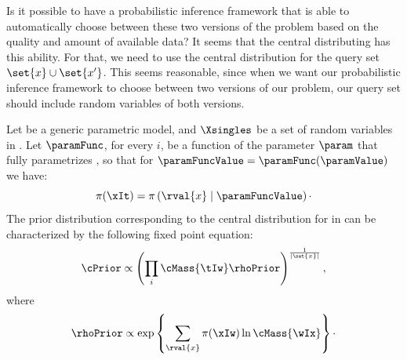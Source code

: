 Is it possible to have a probabilistic inference framework that is able to automatically choose between these two
versions of the problem based on the quality and amount of available data?
It seems that the central distributing has this ability.
For that, we need to use the central distribution for the query set $\set{x} \cup \set{x'}$.
This seems reasonable, since when we want our probabilistic inference framework to choose between two versions of
our problem, our query set should include random variables of both versions.

\begin{theorem}
    Let \pmodel be a generic parametric model, and $\Xsingles$ be a set of random variables in \Mt.
    Let $\paramFunc$, for every $i$, be a function of the parameter $\param$ that fully parametrizes \Qvar,
    so that for $\paramFuncValue = \paramFunc(\paramValue)$ we have:
    \begin{equation}
        \pi(\xIt) = \pi \left( \rval{x} \mid \paramFuncValue \right)\cdot
        \label{eq:func_of_theta}
    \end{equation}
    The prior distribution corresponding to the central distribution for  in \Mt can be characterized
    by the following fixed point equation:
    \begin{equation}
        \cPrior \propto \left( \prod_i \cMass{\tIw} \rhoPrior \right)^{\frac{1}{|\set{x}|}},
        \label{eq:fixed_point_cx}
    \end{equation}
    where
    \[
        \rhoPrior \propto \exp \left\{\sum_{\rval{x}} \pi(\xIw) \ln \cMass{\wIx} \right\}\cdot
    \]

\end{theorem}

